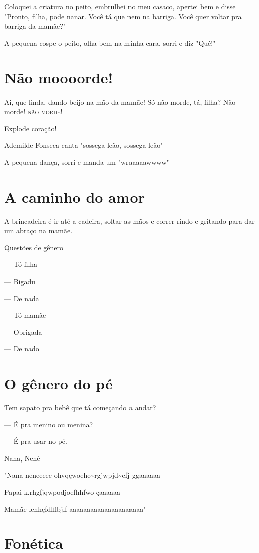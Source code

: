 Coloquei a criatura no peito, embrulhei no meu casaco, apertei bem e
disse "Pronto, filha, pode nanar. Você tá que nem na barriga. Você quer
voltar pra barriga da mamãe?"

A pequena cospe o peito, olha bem na minha cara, sorri e diz "Qué!"

\chapter{Não moooorde!}

Ai, que linda, dando beijo na mão da mamãe! Só não morde, tá, filha? Não
morde! \textsc{não} \textsc{morde}!

Explode coração!

Ademilde Fonseca canta "sossega leão, sossega leão"

A pequena dança, sorri e manda um "wraaaaawwww"

\chapter{A caminho do amor}

A brincadeira é ir até a cadeira, soltar as mãos e correr rindo e
gritando para dar um abraço na mamãe.

Questões de gênero

— Tó filha

— Bigadu

— De nada

— Tó mamãe

— Obrigada

— De nado

\chapter{O gênero do pé}

Tem sapato pra bebê que tá começando a andar?

— É pra menino ou menina?

— É pra usar no pé.

Nana, Nenê

"Nana neneeeee ohvqçwoehe\textasciitilde{}rgjwpjd\textasciitilde{}efj
ggaaaaaa

Papai k.rhgfjqwpodjoefhhfwo çaaaaaa

Mamãe lehhçfdlflbjlf aaaaaaaaaaaaaaaaaaaaa"

\chapter{Fonética}

